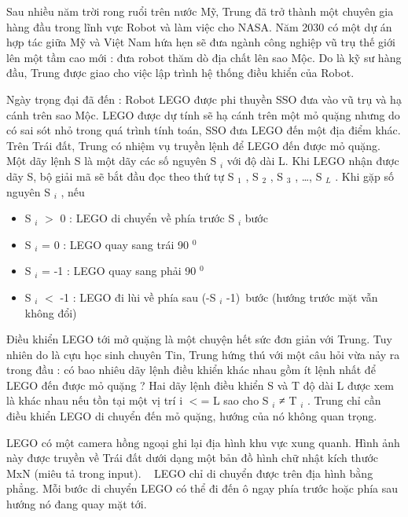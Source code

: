 



\textbf{}   Sau nhiều năm trời rong ruổi trên nước Mỹ, Trung đã trở thành một chuyên gia hàng đầu trong lĩnh vực Robot và làm việc cho NASA. Năm 2030 có một dự án hợp tác giữa Mỹ và Việt Nam hứa hẹn sẽ đưa ngành công nghiệp vũ trụ thế giới lên một tầm cao mới : đưa robot thăm dò địa chất lên sao Mộc. Do là kỹ sư hàng đầu, Trung được giao cho việc lập trình hệ thống điều khiển của Robot.  

   Ngày trọng đại đã đến : Robot LEGO được phi thuyền SSO đưa vào vũ trụ và hạ cánh trên sao Mộc. LEGO được dự tính sẽ hạ cánh trên một mỏ quặng nhưng do có sai sót nhỏ trong quá trình tính toán, SSO đưa LEGO đến một địa điểm khác. Trên Trái đất, Trung có nhiệm vụ truyền lệnh để LEGO đến được mỏ quặng. Một dãy lệnh S là một dãy các số nguyên S   $_    i   $   với độ dài L. Khi LEGO nhận được dãy S, bộ giải mã sẽ bắt đầu đọc theo thứ tự S   $_    1   $   , S   $_    2   $   , S   $_    3   $   , …, S   $_    L   $   . Khi gặp số nguyên S   $_    i   $   , nếu  
\begin{itemize}
	\item     S    $_     i    $    $>$ 0 : LEGO di chuyển về phía trước S    $_     i    $    bước   
	\item     S    $_     i    $    = 0 : LEGO quay sang trái 90    $^     0    $
	\item     S    $_     i    $    = -1 : LEGO quay sang phải 90    $^     0    $
	\item     S    $_     i    $    $<$ -1 : LEGO đi lùi về phía sau (-S    $_     i    $    -1) bước (hướng trước mặt vẫn không đổi)   
\end{itemize}

   Điều khiển LEGO tới mở quặng là một chuyện hết sức đơn giản với Trung. Tuy nhiên do là cựu học sinh chuyên Tin, Trung hứng thú với một câu hỏi vừa nảy ra trong đầu : có bao nhiêu dãy lệnh điều khiển khác nhau gồm ít lệnh nhất để LEGO đến được mỏ quặng ? Hai dãy lệnh điều khiển S và T độ dài L được xem là khác nhau nếu tồn tại một vị trí i $<$= L sao cho S   $_    i   $   ≠ T   $_    i   $   . Trung chỉ cần điều khiển LEGO di chuyển đến mỏ quặng, hướng của nó không quan trọng.  

   LEGO có một camera hồng ngoại ghi lại địa hình khu vực xung quanh. Hình ảnh này được truyền về Trái đất dưới dạng một bản đồ hình chữ nhật kích thước MxN (miêu tả trong input).   LEGO chỉ di chuyển được trên địa hình bằng phẳng. Mỗi bước di chuyển LEGO có thể đi đến ô ngay phía trước hoặc phía sau hướng nó đang quay mặt tới.  


